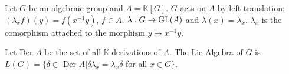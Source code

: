 \documentclass[12pt]{article}
\def\GL{{\rm GL}}
\begin{document}
Let $G$ be an algebraic group and $A = \mathbb{K}[G]$. $G$ acts on $A$ by left translation: $(\lambda_x f)(y) = f(x^{-1}y)$, $f \in A$. $\lambda: G \rightarrow \GL(A)$ and $\lambda(x) = \lambda_x$. $\lambda_x$ is the comorphism attached to the morphism $y \mapsto x^{-1}y$.

Let Der $A$ be the set of all $\mathbb{K}$-derivations of $A$. The Lie Algebra of $G$ is $L(G) = \{\delta \in$ Der $A | \delta\lambda_x = \lambda_x\delta$ for all $x \in G \}$.
\end{document}
